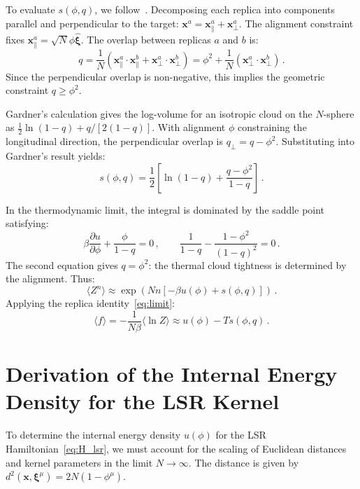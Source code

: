 \documentclass{article}
\theoremstyle{plain}
\theoremstyle{definition}
\theoremstyle{remark}
\begin{document}
To evaluate $s(\phi, q)$, we follow~\citet{gardner1988space}. Decomposing each replica into components parallel and perpendicular to the target: $\bm{x}^a = \bm{x}_\parallel^a + \bm{x}_\perp^a$. The alignment constraint fixes $\bm{x}_\parallel^a = \sqrt{N}\phi \hat{\bm{\xi}}$. The overlap between replicas $a$ and $b$ is:
\begin{equation}
    q = \frac{1}{N} \left( \bm{x}_\parallel^a \cdot \bm{x}_\parallel^b + \bm{x}_\perp^a \cdot \bm{x}_\perp^b \right) = \phi^2 + \frac{1}{N} \left( \bm{x}_\perp^a \cdot \bm{x}_\perp^b \right)\,.
\end{equation}
Since the perpendicular overlap is non-negative, this implies the geometric constraint $q \ge \phi^2$.

Gardner's calculation gives the log-volume for an isotropic cloud on the $N$-sphere as $\frac{1}{2}\ln(1-q) + q/[2(1-q)]$. With alignment $\phi$ constraining the longitudinal direction, the perpendicular overlap is $q_\perp = q - \phi^2$. Substituting into Gardner's result yields:
\begin{equation}
    s(\phi, q) = \frac{1}{2} \left[ \ln(1-q) + \frac{q - \phi^2}{1-q} \right]\,.
\end{equation}

In the thermodynamic limit, the integral is dominated by the saddle point satisfying:
\begin{equation}
    \beta \frac{\partial u}{\partial \phi} + \frac{\phi}{1-q} = 0\,,\qquad 
    \frac{1}{1-q} - \frac{1-\phi^2}{(1-q)^2} = 0\,.
\end{equation}
The second equation gives $q = \phi^2$: the thermal cloud tightness is determined by the alignment. Thus:
\begin{equation}
    \langle Z^n \rangle \approx \exp\left( N n [-\beta u(\phi) + s(\phi, q)] \right)\,.
\end{equation}
Applying the replica identity~\eqref{eq:limit}:
\begin{equation}
    \langle f \rangle = -\frac{1}{N\beta} \langle \ln Z \rangle 
    \approx u(\phi) - T s(\phi, q)\,.
\end{equation}




\section{Derivation of the Internal Energy Density for the LSR Kernel}\label{app:lsr_energy}

To determine the internal energy density $u(\phi)$ for the LSR Hamiltonian~\eqref{eq:H_lsr}, we must account for the scaling of Euclidean distances and kernel parameters in the limit $N \to \infty$. The distance is given by $d^2(\bm{x}, \bm{\xi}^\mu) = 2N(1 - \phi^\mu)$.
\end{document}
